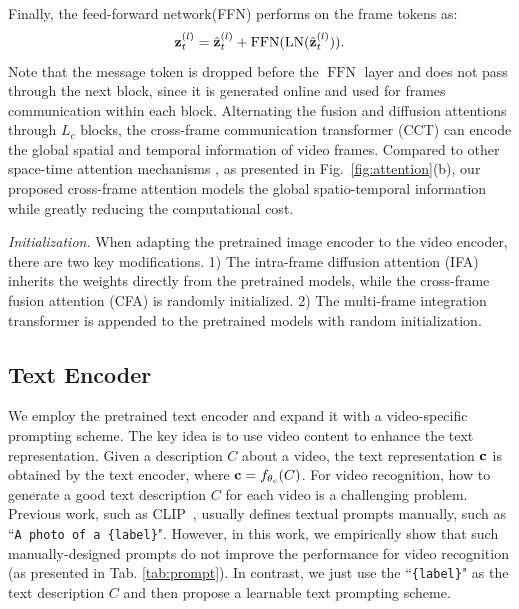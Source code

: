 \documentclass[runningheads]{llncs}
\begin{document}
Finally, the feed-forward network(FFN) performs on the frame tokens as:
\begin{equation}
    {\bf{z}}^{(l)}_t = \hat{{\bf{z}}}^{(l)}_t + \operatorname{FFN}(\operatorname{LN}(\hat{{\bf{z}}}^{(l)}_t)).\label{equ:10}
\end{equation}
Note that the message token is dropped before the $\operatorname{FFN}$ layer and does not pass through the next block, since it is generated online and used for frames communication within each block. Alternating the fusion and diffusion attentions through $L_c$ blocks, the cross-frame communication transformer (CCT) can encode the global spatial and temporal information of video frames. Compared to other space-time attention mechanisms \cite{arnab2021vivit,timesformer2021,liu2021video}, as presented in Fig.~\ref{fig:attention}(b), our proposed cross-frame attention models the global spatio-temporal information while greatly reducing the computational cost.

\textit{Initialization.} When adapting the pretrained image encoder to the video encoder, there are two key modifications. 1) The intra-frame diffusion attention (IFA) inherits the weights directly from the pretrained models, while the cross-frame fusion attention (CFA) is randomly initialized. 2) The multi-frame integration transformer is appended to the pretrained models with random initialization. 

\subsection{Text Encoder}\label{sec:text}
We employ the pretrained text encoder and expand it with a video-specific prompting scheme. The key idea is to use video content to enhance the text representation. Given a description $C$ about a video, the text representation $\bf{c}$ is obtained by the text encoder, where ${\bf{c}}=f_{\theta_c}(C)$. For video recognition, how to generate a good text description $C$ for each video is a challenging problem. Previous work, such as CLIP~\cite{clip}, usually defines textual prompts manually, such as ``\texttt{A photo of a \{label\}}". However, in this work, we empirically show that such manually-designed prompts do not improve the performance for video recognition (as presented in Tab. \ref{tab:prompt}). In contrast, we just use the ``\texttt{\{label\}}" as the text description $C$ and then propose a learnable text prompting scheme. 
\end{document}
